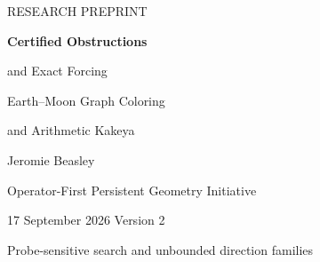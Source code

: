 \documentclass[11pt,letterpaper]{article}
\theoremstyle{definition}
\theoremstyle{remark}\newtheorem{remark}[theorem]{Remark}
\begin{document}
\begin{titlepage}
\vspace*{0.05in}
\begin{center}
{\small RESEARCH PREPRINT}\par
\vspace{0.20in}
{\LARGE\bfseries Certified Obstructions\par and Exact Forcing}\par
\vspace{0.2in}
{\Large Earth--Moon Graph Coloring\par and Arithmetic Kakeya}\par
\vspace{0.24in}
{\large Jeromie Beasley}\par
\vspace{0.08in}
{Operator-First Persistent Geometry Initiative}\par
\vspace{0.12in}
{17 September 2026 \quad\textbullet\quad Version 2}\par
\vspace{0.10in}
{\small Probe-sensitive search and unbounded direction families}\par
\end{center}
\vspace{0.12in}
\begin{abstract}
We develop certificate-based approaches to the Earth--Moon and arithmetic Kakeya construction problems. For Earth--Moon, a triangle-free subgraph bound excludes inflated cycles $C_n[K_r]$ for $n,r\geq4$. Explicit decompositions prove $\theta(C_n[K_4])=3$, and an explicit coloring proves that every biplanar subgraph of $C_7[K_4]$ is nine-colorable. A separate nineteen-vertex reduction retains its archived $100$--$102$-edge endpoint restriction.

For arithmetic Kakeya, exact nonzero-multiple forcing is expressed through row spaces and integer primal--dual certificates. We derive a target-sensitive numerator-residue criterion and exact kernel updates, then classify the first possible escape produced by one variable site generator. On the fixed six-vertex Katz--Tao edge core, this reduces 5,166 unbounded integer-label families to 6,112 checked representatives: two generator placements come from a specified seven-direction pool, while the third direction is unrestricted. All are excluded by 25,498 integer target-dual identities. A separate 36-family exclusion covers one initially known site and one arbitrary generator.


\end{abstract}
\end{titlepage}
\end{document}
